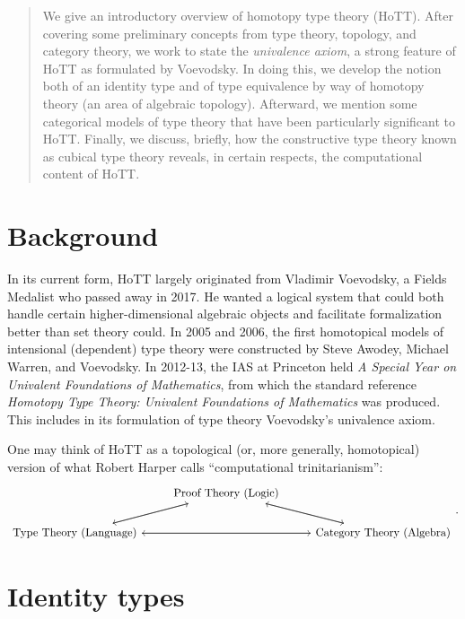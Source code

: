\documentclass[10pt,letterpaper,cm]{nupset}
\theoremstyle{definition}
\newcommand{\1}{\mathbf{1}}
\newcommand{\0}{\vec 0}
\begin{document}
\begin{abstract}
We give an introductory overview of homotopy type theory (HoTT). After covering some preliminary concepts from type theory, topology, and category theory, we work to state the \textit{univalence axiom}, a strong feature of HoTT as formulated by Voevodsky. In doing this, we develop the notion both of an identity type and of type equivalence by way of homotopy theory (an area of algebraic topology). Afterward, we mention some categorical models of type theory that have been particularly significant to HoTT. Finally, we discuss, briefly, how the constructive type theory known as cubical type theory reveals, in certain respects, the computational content of HoTT.
\end{abstract}



\tableofcontents
\newpage


\section*{Background}

In its current form, HoTT largely originated from Vladimir Voevodsky, a Fields Medalist who passed away in 2017. He wanted a logical system that could both handle certain higher-dimensional algebraic objects and facilitate formalization better than set theory could. In 2005 and 2006, the first homotopical models of intensional (dependent) type theory were constructed by Steve Awodey, Michael Warren, and Voevodsky. In 2012-13,  the IAS at Princeton held \textit{A Special Year on Univalent Foundations of Mathematics}, from which the standard reference \textit{Homotopy Type Theory: Univalent Foundations of Mathematics} was produced. This includes in its formulation of type theory Voevodsky's univalence axiom.

One may think of HoTT as a topological (or, more generally, homotopical) version of what Robert Harper calls ``computational trinitarianism'':
\[
\begin{tikzcd}
 & \text{Proof Theory (Logic)} \arrow[rd] \arrow[ld] &  \\
\text{Type Theory (Language)} \arrow[ru] \arrow[rr] &  & \text{Category Theory (Algebra)} \arrow[lu] \arrow[ll]
\end{tikzcd}
.\]

\section{Identity types}
\end{document}
